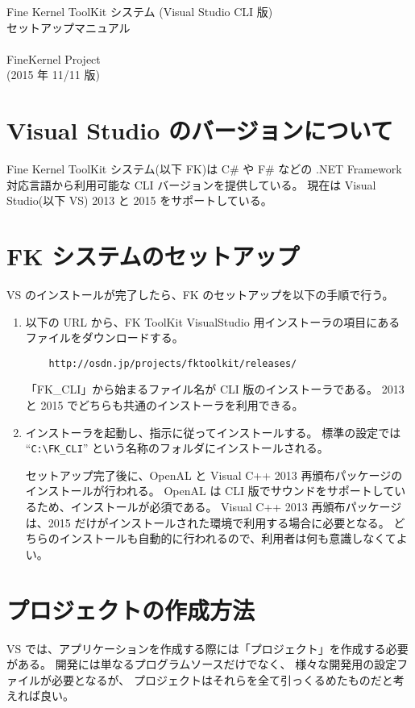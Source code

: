 \documentclass[a4j]{jarticle}
\begin{document}
\begin{center}
{\Large Fine Kernel ToolKit システム (Visual Studio CLI 版) \\
	セットアップマニュアル} \\ ~ \\
{\Large FineKernel Project} \\
(2015 年 11/11 版)
\end{center}


\section{Visual Studio のバージョンについて}
Fine Kernel ToolKit システム(以下 FK)は 
C\# や F\# などの .NET Framework 対応言語から利用可能な CLI バージョンを提供している。
現在は Visual Studio(以下 VS) 2013 と 2015 をサポートしている。

\section{FK システムのセットアップ}
VS のインストールが完了したら、FK のセットアップを以下の手順で行う。

\begin{enumerate}
\item 以下の URL から、FK ToolKit VisualStudio 用インストーラの項目にある
ファイルをダウンロードする。

\begin{verbatim}
    http://osdn.jp/projects/fktoolkit/releases/
\end{verbatim}

「FK\_CLI」から始まるファイル名が CLI 版のインストーラである。
2013 と 2015 でどちらも共通のインストーラを利用できる。

\item インストーラを起動し、指示に従ってインストールする。
標準の設定では ``\verb+C:\FK_CLI+'' という名称のフォルダにインストールされる。

セットアップ完了後に、OpenAL と Visual C++ 2013 再頒布パッケージのインストールが行われる。
OpenAL は CLI 版でサウンドをサポートしているため、インストールが必須である。
Visual C++ 2013 再頒布パッケージは、2015 だけがインストールされた環境で利用する場合に必要となる。
どちらのインストールも自動的に行われるので、利用者は何も意識しなくてよい。

\end{enumerate}

\section{プロジェクトの作成方法}
VS では、アプリケーションを作成する際には「プロジェクト」を作成する必要がある。
開発には単なるプログラムソースだけでなく、
様々な開発用の設定ファイルが必要となるが、
プロジェクトはそれらを全て引っくるめたものだと考えれば良い。
\end{document}
